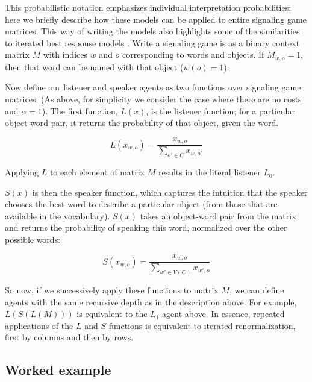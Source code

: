 This probabilistic notation emphasizes individual interpretation probabilities; here we briefly describe how these models can be applied to entire signaling game matrices. This way of writing the models also highlights some of the similarities to iterated best response models \cite{jager2010}. Write a signaling game is as a binary context matrix $M$ with indices $w$ and $o$ corresponding to words and objects. If $M_{w,o} = 1$, then that word can be named with that object ($w(o) = 1$). 

Now define our listener and speaker agents as two functions over signaling game matrices. (As above, for simplicity we consider the case where there are no costs and $\alpha=1$). The first function, $L(x)$, is the listener function; for a particular object word pair, it returns the probability of that object, given the word. 

\begin{equation}
L(x_{w,o}) = \frac{x_{w,o}}{\displaystyle\sum_{o' \in C} x_{w,o'} } 
\end{equation}

\noindent Applying $L$ to each element of matrix $M$ results in the literal listener $L_0$. 

$S(x)$ is then the speaker function, which captures the intuition that the speaker chooses the best word to describe a particular object (from those that are available in the vocabulary). $S(x)$ takes an object-word pair from the matrix and returns the probability of speaking this word, normalized over the other possible words:

\begin{equation}
S(x_{w,o}) = \frac{x_{w,o}}{\displaystyle \sum_{w' \in V(C)} x_{w',o}}
\end{equation}

So now, if we successively apply these functions to matrix $M$, we can define agents with the same recursive depth as in the description above. For example, $L(S(L(M)))$ is equivalent to the $L_1$ agent above. In essence, repeated applications of the $L$ and $S$ functions is equivalent to iterated renormalization, first by columns and then by rows. 

\subsection{Worked example}

